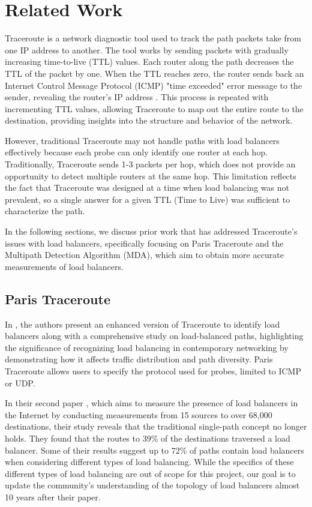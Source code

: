 \documentclass[12pt]{cwru_thesis}
\begin{document}
\chapter{Related Work}

Traceroute is a network diagnostic tool used to track the path packets take from one IP address to another. The tool works by sending packets with gradually increasing time-to-live (TTL) values. Each router along the path decreases the TTL of the packet by one. When the TTL reaches zero, the router sends back an Internet Control Message Protocol (ICMP) "time exceeded" error message to the sender, revealing the router's IP address \cite{rfc792}. This process is repeated with incrementing TTL values, allowing Traceroute to map out the entire route to the destination, providing insights into the structure and behavior of the network.

However, traditional Traceroute may not handle paths with load balancers effectively because each probe can only identify one router at each hop. Traditionally, Traceroute sends 1-3 packets per hop, which does not provide an opportunity to detect multiple routers at the same hop. This limitation reflects the fact that Traceroute was designed at a time when load balancing was not prevalent, so a single answer for a given TTL (Time to Live) was sufficient to characterize the path. 

In the following sections, we discuss prior work that has addressed Traceroute's issues with load balancers, specifically focusing on Paris Traceroute and the Multipath Detection Algorithm (MDA), which aim to obtain more accurate measurements of load balancers.


\section{Paris Traceroute}

In \cite{4261334}, the authors present an enhanced version of Traceroute to identify load balancers along with a comprehensive study on load-balanced paths, highlighting the significance of recognizing load balancing in contemporary networking by demonstrating how it affects traffic distribution and path diversity. Paris Traceroute allows users to specify the protocol used for probes, limited to ICMP or UDP. 


In their second paper \cite{augustin2010measuring}, which aims to measure the presence of load balancers in the Internet by conducting measurements from 15 sources to over 68,000 destinations, their study reveals that the traditional single-path concept no longer holds. They found that the routes to 39\% of the destinations traversed a load balancer. Some of their results suggest up to 72\% of paths contain load balancers when considering different types of load balancing. While the specifics of these different types of load balancing are out of scope for this project, our goal is to update the community's understanding of the topology of load balancers almost 10 years after their paper.
\end{document}
